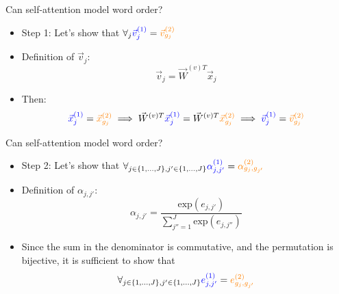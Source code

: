 
\begin{vbframe}{Can self-attention model word order?}

\vfill

\begin{itemize}
\item Step 1: Let's show that $\forall_{j} \textcolor{blue}{\vec v^{(1)}_{j}} = \textcolor{orange}{\vec v^{(2)}_{g_{j}}}$
\item Definition of $\vec v_j$:
$$\vec v_j = \vec W^{(v)T} \vec x_j$$
\item Then:
$$\textcolor{blue}{\vec x^{(1)}_{j}} = \textcolor{orange}{\vec x^{(2)}_{g_{j}}} \implies \vec W^{(v)T} \textcolor{blue}{\vec x^{(1)}_{j}} = \vec W^{(v)T} \textcolor{orange}{\vec x^{(2)}_{g_{j}}} \implies \textcolor{blue}{\vec v^{(1)}_j} = \textcolor{orange}{\vec v^{(2)}_{g_j}}$$
\end{itemize}

\vfill

\end{vbframe}


\begin{vbframe}{Can self-attention model word order?}

\vfill

\begin{itemize}
\item Step 2: Let's show that $\forall_{j \in \{1,...,J\}, j' \in \{1,...,J\}} \textcolor{blue}{\alpha^{(1)}_{j, j'}} = \textcolor{orange}{\alpha^{(2)}_{g_j, g_{j'}}}$
\item Definition of $\alpha_{j,j'}$:
$$\alpha_{j,j'} = \frac{\mathrm{exp}(e_{j,j'})}{\sum_{j''=1}^J \mathrm{exp}(e_{j,j''})}$$
\item Since the sum in the denominator is commutative, and the permutation is bijective, it is sufficient to show that
$$\forall_{j \in \{1,...,J\}, j' \in \{1,...,J\}} \textcolor{blue}{e^{(1)}_{j,j'}} = \textcolor{orange}{e^{(2)}_{g_j, g_{j'}}}$$
\end{itemize}

\vfill

\end{vbframe}


